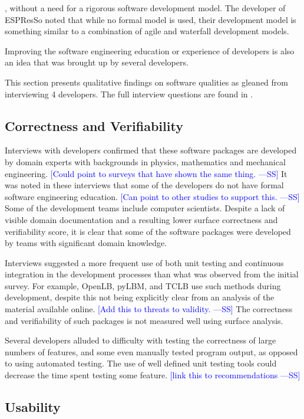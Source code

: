 \documentclass[final, 3p, times, authoryear]{elsarticle}
\newcommand{\authornote}[3]{\textcolor{#1}{[#3 ---#2]}}
\newcommand{\authornote}[3]{}
\newcommand{\wss}[1]{\authornote{blue}{SS}{#1}} %
\begin{document}
, without a need for a rigorous software development model. The developer of
ESPResSo noted that while no formal model is used, their development model is
something similar to a combination of agile and waterfall development models. 

Improving the software engineering
education or experience of developers is also an idea that was brought up by
several developers.

This section presents qualitative findings on software qualities as gleaned from
interviewing 4 developers. The full interview questions are found in
\citet{SmithEtAl2021}.

\subsection{Correctness and Verifiability}

Interviews with developers confirmed that these software packages are developed
by domain experts with backgrounds in physics, mathematics and mechanical
engineering. \wss{Could point to surveys that have shown the same thing.}  It
was noted in these interviews that some of the developers do not have formal
software engineering education. \wss{Can point to other studies to support
this.} Some of the development teams include computer scientists. Despite a lack
of visible domain documentation and a resulting lower surface correctness and
verifiability score, it is clear that some of the software packages were
developed by teams with significant domain knowledge. 

Interviews suggested a more frequent use of both unit testing and continuous
integration in the development processes than what was observed from the initial
survey. For example, OpenLB, pyLBM, and TCLB use such methods during development,
despite this not being explicitly clear from an analysis of the material
available online. \wss{Add this to threats to validity.}  The correctness and
verifiability of such packages is not measured well using surface analysis.

Several developers alluded to difficulty with testing the correctness of large
numbers of features, and some even manually tested program output, as opposed to
using automated testing. The use of well defined unit testing tools could
decrease the time spent testing some feature.  \wss{link this to
recommendations}

\subsection{Usability}
\end{document}
